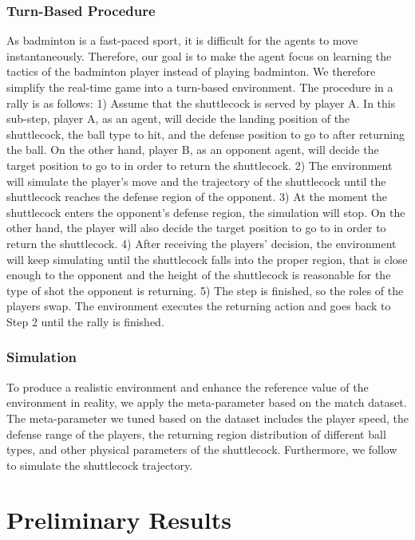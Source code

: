 \documentclass[letterpaper]{article} %
\begin{document}
\subsubsection{Turn-Based Procedure}
As badminton is a fast-paced sport, it is difficult for the agents to move instantaneously.
Therefore, our goal is to make the agent focus on learning the tactics of the badminton player instead of playing badminton.
We therefore simplify the real-time game into a turn-based environment.
The procedure in a rally is as follows: 1) Assume that the shuttlecock is served by player A. In this sub-step, player A, as an agent, will decide the landing position of the shuttlecock, the ball type to hit, and the defense position to go to after returning the ball.
On the other hand, player B, as an opponent agent, will decide the target position to go to in order to return the shuttlecock.
2) The environment will simulate the player's move and the trajectory of the shuttlecock until the shuttlecock reaches the defense region of the opponent.
3) At the moment the shuttlecock enters the opponent's defense region, the simulation will stop.
On the other hand, the player will also decide the target position to go to in order to return the shuttlecock.
4) After receiving the players' decision, the environment will keep simulating until the shuttlecock falls into the proper region, that is close enough to the opponent and the height of the shuttlecock is reasonable for the type of shot the opponent is returning.
5) The step is finished, so the roles of the players swap. The environment executes the returning action and goes back to Step 2 until the rally is finished.

\subsubsection{Simulation}
To produce a realistic environment and enhance the reference value of the environment in reality, we apply the meta-parameter based on the match dataset.
The meta-parameter we tuned based on the dataset includes the player speed, the defense range of the players, the returning region distribution of different ball types, and other physical parameters of the shuttlecock.
Furthermore, we follow \cite{Chen2009ASO} to simulate the shuttlecock trajectory.

\section{Preliminary Results}
\end{document}

